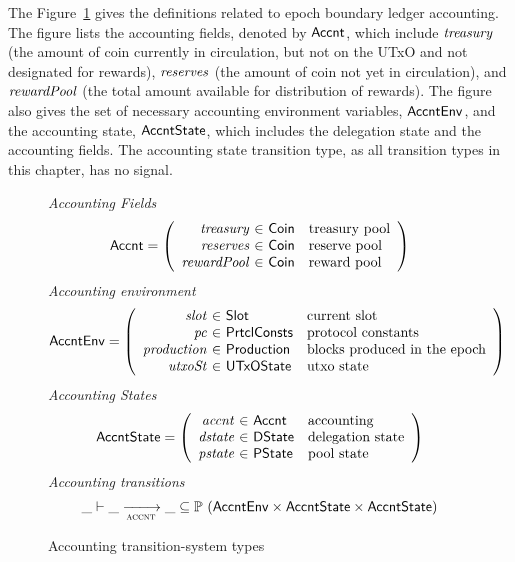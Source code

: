 The Figure~\ref{fig:ts-types:accnt} gives the definitions related to epoch
boundary ledger accounting. The figure lists the accounting fields, denoted by
$\mathsf{Accnt}$, which include $\mathit{treasury}$ (the amount of coin currently in
circulation, but not on the UTxO and not designated for rewards),
$\mathit{reserves}$ (the amount of coin
not yet in circulation),
and $\mathit{rewardPool}$ (the total amount available for distribution of rewards).
The figure also gives the set of necessary accounting environment
variables, $\mathsf{AccntEnv}$, and the accounting state, $\mathsf{AccntState}$, which includes
the delegation state and the accounting fields. The accounting state transition
type, as all transition types in this chapter, has no signal.

\begin{figure}[htb]
  \emph{Accounting Fields}
  \begin{equation*}
    \Accnt =
    \left(
      \begin{array}{r@{~\in~}ll}
        \var{treasury} & \Coin & \text{treasury pool}\\
        \var{reserves} & \Coin & \text{reserve pool}\\
        \var{rewardPool} & \Coin & \text{reward pool}\\
      \end{array}
    \right)
  \end{equation*}
  \emph{Accounting environment}
  \begin{equation*}
    \AccntEnv =
    \left(
      \begin{array}{r@{~\in~}ll}
        \var{slot} & \Slot & \text{current slot}\\
        \var{pc} & \PrtclConsts & \text{protocol constants}\\
        \var{production} & \Production & \text{blocks produced in the epoch}\\
        \var{utxoSt} & \UTxOState & \text{utxo state}\\
      \end{array}
    \right)
  \end{equation*}
  \emph{Accounting States}
  \begin{equation*}
    \AccntState =
    \left(
      \begin{array}{r@{~\in~}ll}
        \var{accnt} & \Accnt & \text{accounting}\\
        \var{dstate} & \DState & \text{delegation state}\\
        \var{pstate} & \PState & \text{pool state}\\
      \end{array}
    \right)
  \end{equation*}
  \emph{Accounting transitions}
  \begin{equation*}
    \_ \vdash
    \var{\_} \trans{accnt}{} \var{\_}
    \subseteq \powerset (\AccntEnv \times \AccntState \times \AccntState)
  \end{equation*}
  \caption{Accounting transition-system types}
  \label{fig:ts-types:accnt}
\end{figure}


